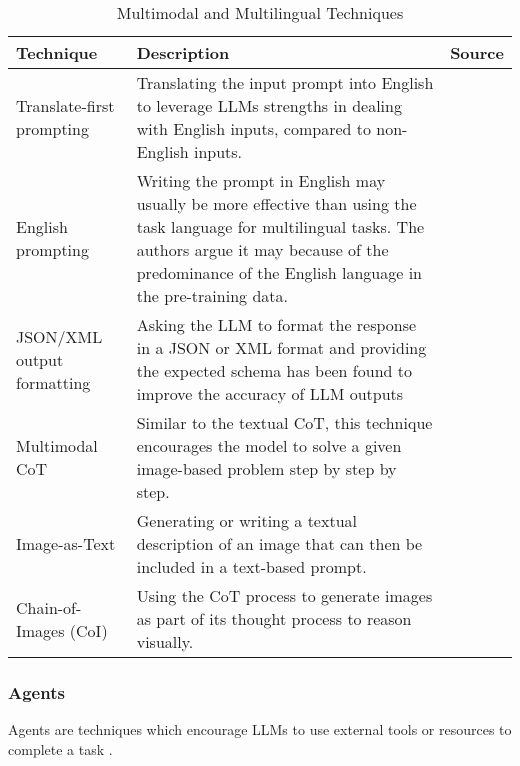 \begin{table}[h!]
    \centering
    \begin{tabular}{p{3cm} p{8cm} p{2cm}}
        \toprule
        \textbf{Technique} & \textbf{Description} & \textbf{Source} \\
        \midrule
        \raggedright
        Translate-first prompting & Translating the input prompt into English to leverage LLMs strengths in dealing with English inputs, compared to non-English inputs. & \textcite{translate-first} \\
        \hline
        \raggedright
        English prompting & Writing the prompt in English may usually be more effective than using the task language for multilingual tasks. The authors argue it may because of the predominance of the English language in the pre-training data. & \textcite{english-prompting} \\
        \hline
        \raggedright
        JSON/XML output formatting & Asking the LLM to format the response in a JSON or XML format and providing the expected schema has been found to improve the accuracy of LLM outputs  & \textcite{jsonllm} \\
        \hline
        \raggedright
        Multimodal CoT & Similar to the textual CoT, this technique encourages the model to solve a given image-based problem step by step by step. & \textcite{multimodal-cot} \\
        \hline
        \raggedright
        Image-as-Text & Generating or writing a textual description of an image that can then be included in a text-based prompt. & \textcite{images-as-text} \\
        \hline
        \raggedright
        Chain-of-Images (CoI) & Using the CoT process to generate images as part of its thought process to reason visually. & \textcite{coi} \\
        \bottomrule
    \end{tabular}
    \caption{Multimodal and Multilingual Techniques}
    \label{tab:multi_prompt}
\end{table}

\FloatBarrier

\subsubsection{Agents}

Agents are techniques which encourage LLMs to use external tools or resources to complete a task \parencite{prompt1}.

